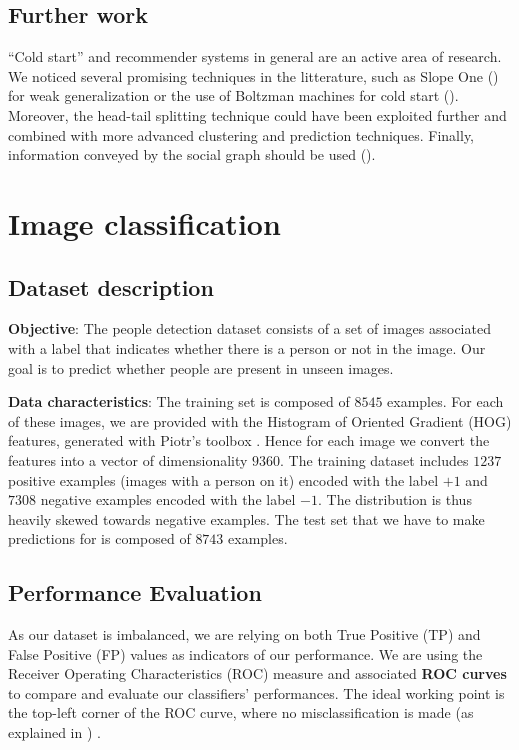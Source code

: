 \documentclass[10pt,a4paper]{article}
\begin{document}
  \subsection{Further work}
  ``Cold start'' and recommender systems in general are an active area of research. We noticed several promising techniques in the litterature, such as Slope One (\cite{slope-one}) for weak generalization or the use of Boltzman machines for cold start (\cite{cold-start-metrics}). Moreover, the head-tail splitting technique could have been exploited further and combined with more advanced clustering and prediction techniques. Finally, information conveyed by the social graph should be used (\cite{top-k-with-social-network}).

\section{Image classification}

  \subsection{Dataset description}
  \textbf{Objective}: The people detection dataset consists of a set of images associated with a label that indicates whether there is a person or not in the image. Our goal is to predict whether people are present in unseen images.

  \textbf{Data characteristics}: The training set is composed of $8545$ examples. For each of these images, we are provided with the Histogram of Oriented Gradient (HOG) features, generated with Piotr's toolbox \cite{piotrtoolbox}. Hence for each image we convert the features into a vector of dimensionality $9360$. The training dataset includes $1237$ positive examples (images with a person on it) encoded with the label $+1$ and $7308$ negative examples encoded with the label $-1$. The distribution is thus heavily skewed towards negative examples. The test set that we have to make predictions for is composed of $8743$ examples.

  \subsection{Performance Evaluation}
  As our dataset is imbalanced, we are relying on both True Positive (TP) and False Positive (FP) values as indicators of our performance. We are using the Receiver Operating Characteristics (ROC) measure and associated \textbf{ROC curves} to compare and evaluate our classifiers' performances. The ideal working point is the top-left corner of the ROC curve, where no misclassification is made (as explained in \cite{rocanalysis}) .
\end{document}
